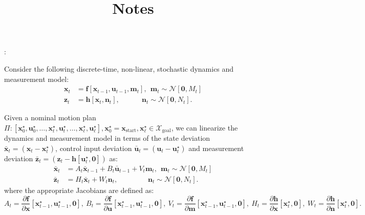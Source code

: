 \documentclass[letterpaper]{article}
\begin{document}
\title{\vspace{-20pt} Notes}

\author{}
\date{}

\maketitle

\vspace{-20pt}
:

Consider the following discrete-time, non-linear, stochastic dynamics and measurement model:
\begin{align}
\mathbf{x}_{t} &= \mathbf{f}[\mathbf{x}_{t-1}, \mathbf{u}_{t-1}, \mathbf{m}_t], ~~ \mathbf{m}_t \sim \mathcal{N} [\mathbf{0}, M_t] \label{eq:dynmodel} \\
\mathbf{z}_t &= \mathbf{h}[\mathbf{x}_t, \mathbf{n}_t], ~~~~~~~~~~~~~~ \mathbf{n}_t \sim \mathcal{N}[\mathbf{0}, N_t]. \label{eq:obsmodel}
\end{align}

Given a nominal motion plan $\Pi: [\mathbf{x}^{\star}_{0}, \mathbf{u}^{\star}_{0}, \ldots, \mathbf{x}^{\star}_{t},\mathbf{u}^{\star}_{t},\ldots, \mathbf{x}^{\star}_{\ell},\mathbf{u}^{\star}_{\ell}], \mathbf{x}^{\star}_{0} = \mathbf{x}_{\mathrm{start}}, \mathbf{x}^{\star}_{\ell} \in \mathcal{X}_{\mathrm{goal}}$, we can linearize the dynamics and measurement model in terms of the state deviation $\bar{\mathbf{x}}_t = (\mathbf{x}_t - \mathbf{x}^{\star}_{t})$, control input deviation $\bar{\mathbf{u}}_t = (\mathbf{u}_t - \mathbf{u}^{\star}_{t})$ and measurement deviation $\bar{\mathbf{z}}_t = (\mathbf{z}_t - \mathbf{h}[\mathbf{u}^{\star}_{t}, \mathbf{0}])$ as:
\begin{align}
\bar{\mathbf{x}}_t &= A_t\bar{\mathbf{x}}_{t-1} + B_t\bar{\mathbf{u}}_{t-1} + V_t\mathbf{m}_t, ~~ \mathbf{m}_t \sim \mathcal{N} [\mathbf{0}, M_t] \label{eq:lindynmodel} \\
\bar{\mathbf{z}}_t &= H_t\bar{\mathbf{x}}_{t} + W_t\mathbf{n}_t, ~~~~~~~~~~~~~~~~~~~ \mathbf{n}_t \sim \mathcal{N} [\mathbf{0}, N_t]. \label{eq:linobsmodel}
\end{align}
where the appropriate Jacobians are defined as:
\begin{displaymath}
A_t = \frac{\partial\mathbf{f}}{\partial\mathbf{x}}[\mathbf{x}^{\star}_{t-1}, \mathbf{u}^{\star}_{t-1},\mathbf{0}],~ B_t = \frac{\partial\mathbf{f}}{\partial\mathbf{u}}[\mathbf{x}^{\star}_{t-1}, \mathbf{u}^{\star}_{t-1},\mathbf{0}],~ V_t = \frac{\partial\mathbf{f}}{\partial\mathbf{m}}[\mathbf{x}^{\star}_{t-1}, \mathbf{u}^{\star}_{t-1},\mathbf{0}],~ H_t = \frac{\partial\mathbf{h}}{\partial\mathbf{x}}[\mathbf{x}^{\star}_{t}, \mathbf{0}],~ W_t = \frac{\partial\mathbf{h}}{\partial\mathbf{n}}[\mathbf{x}^{\star}_{t}, \mathbf{0}].
\end{displaymath}
\end{document}
